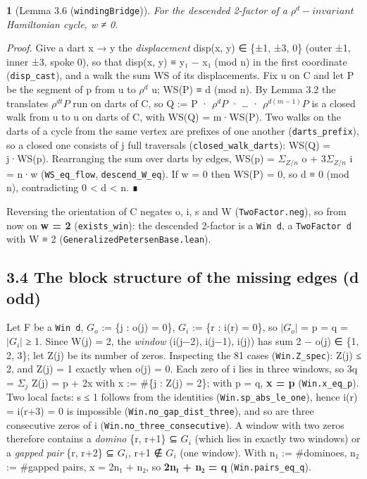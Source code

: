 \documentclass[11pt,a4paper]{article}
\theoremstyle{named}
\newtheorem*{namedthm}{}
\begin{document}
\begin{namedthm}[Lemma 3.6 (\texttt{windingBridge})]
For the descended 2-factor of a $ρ^d-invariant$ Hamiltonian cycle, w ≠ 0.
\end{namedthm}

\textit{Proof.} Give a dart x → y the \textit{displacement} disp(x, y) ∈ \{±1, ±3, 0\} (outer ±1, inner ±3, spoke 0), so that disp(x, y) ≡ y₁ − x₁ (mod n) in the first coordinate (\texttt{disp\_\allowbreak{}cast}), and a walk the sum WS of its displacements. Fix u on C and let P be the segment of p from u to $ρ^d$ u; WS(P) ≡ d (mod n). By Lemma 3.2 the translates $ρ^{dt}P$ run on darts of C, so Q := P · $ρ^dP$ · … · $ρ^{d(m−1)}P$ is a closed walk from u to u on darts of C, with WS(Q) = m·WS(P). Two walks on the darts of a cycle from the same vertex are prefixes of one another (\texttt{darts\_\allowbreak{}prefix}), so a closed one consists of j full traversals (\texttt{closed\_\allowbreak{}walk\_\allowbreak{}darts}): WS(Q) = j·WS(p). Rearranging the sum over darts by edges, WS(p) = $Σ_{Z/n}$ o + $3Σ_{Z/n}$ i = n·w (\texttt{WS\_\allowbreak{}eq\_\allowbreak{}flow}, \texttt{descend\_\allowbreak{}W\_\allowbreak{}eq}). If w = 0 then WS(P) = 0, so d ≡ 0 (mod n), contradicting 0 \textless{} d \textless{} n. ∎

Reversing the orientation of C negates o, i, s and W (\texttt{TwoFactor.\allowbreak{}neg}), so from now on \textbf{w = 2} (\texttt{exists\_\allowbreak{}win}): the descended 2-factor is a \texttt{Win\ \allowbreak{}d}, a \texttt{TwoFactor\ \allowbreak{}d} with W ≡ 2 (\texttt{GeneralizedPetersenBase.\allowbreak{}lean}).

\subsection*{3.4 The block structure of the missing edges (d odd)}
Let F be a \texttt{Win\ \allowbreak{}d}, $G_o$ := \{j : o(j) = 0\}, $G_i$ := \{r : i(r) = 0\}, so $|G_o|$ = p = q = $|G_i|$ ≥ 1. Since W(j) = 2, the \textit{window} (i(j−2), i(j−1), i(j)) has sum 2 − o(j) ∈ \{1, 2, 3\}; let Z(j) be its number of zeros. Inspecting the 81 cases (\texttt{Win.\allowbreak{}Z\_\allowbreak{}spec}): Z(j) ≤ 2, and Z(j) = 1 exactly when o(j) = 0. Each zero of i lies in three windows, so 3q = $Σ_j$ Z(j) = p + 2x with x := \#\{j : Z(j) = 2\}; with p = q, \textbf{x = p} (\texttt{Win.\allowbreak{}x\_\allowbreak{}eq\_\allowbreak{}p}). Two local facts: \textbar{}s\textbar{} ≤ 1 follows from the identities (\texttt{Win.\allowbreak{}sp\_\allowbreak{}abs\_\allowbreak{}le\_\allowbreak{}one}), hence i(r) = i(r+3) = 0 is impossible (\texttt{Win.\allowbreak{}no\_\allowbreak{}gap\_\allowbreak{}dist\_\allowbreak{}three}), and so are three consecutive zeros of i (\texttt{Win.\allowbreak{}no\_\allowbreak{}three\_\allowbreak{}consecutive}). A window with two zeros therefore contains a \textit{domino} \{r, r+1\} ⊆ $G_i$ (which lies in exactly two windows) or a \textit{gapped pair} \{r, r+2\} ⊆ $G_i$, r+1 ∉ $G_i$ (one window). With n₁ := \#dominoes, n₂ := \#gapped pairs, x = 2n₁ + n₂, so \textbf{2n₁ + n₂ = q} (\texttt{Win.\allowbreak{}pairs\_\allowbreak{}eq\_\allowbreak{}q}).
\end{document}
